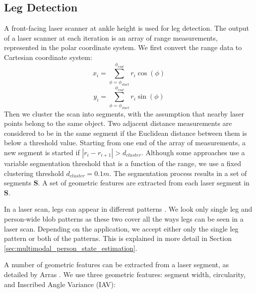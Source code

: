 \subsection{Leg Detection}
\label{sec:multimodal_leg_detection}

A front-facing laser scanner at ankle height is used for leg detection. The output of a laser scanner at each iteration is an array of range measurements, represented in the polar coordinate system. We first convert the range data to Cartesian coordinate system:
\[
x_{i} = \sum_{\phi = \phi_{start}}^{\phi_{end}} r_i\cos(\phi)
\]
\[
y_{i} = \sum_{\phi = \phi_{start}}^{\phi_{end}} r_i\sin(\phi)
\]
Then we cluster the scan into segments, with the assumption that nearby laser points belong to the same object. Two adjacent distance measurements are considered to be in the same segment if the Euclidean distance between them is below a threshold value. Starting from one end of the array of measurements, a new segment is started if $|r_{i}-r_{i+1}|>d_{cluster}$. Although some approaches use a variable segmentation threshold that is a function of the range, we use a fixed clustering threshold $d_{cluster}=0.1m$. The segmentation process results in a set of segments $\mathbf{S}$. A set of geometric features are extracted from each laser segment in $\mathbf{S}$.

In a laser scan, legs can appear in different patterns \cite{topp2005tracking}. We look only single leg and person-wide blob patterns as these two cover all the ways legs can be seen in a laser scan. Depending on the application, we accept either only the single leg pattern or both of the patterns. This is explained in more detail in Section \ref{sec:multimodal_person_state_estimation}.

A number of geometric features can be extracted from a laser segment, as detailed by Arras \cite{arras2007using}. We use three geometric features: segment width, circularity, and Inscribed Angle Variance (IAV):


